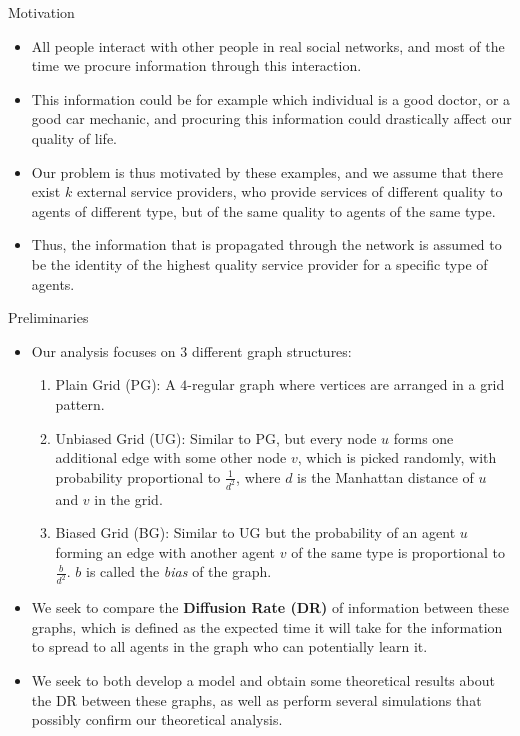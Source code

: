 \documentclass{beamer}
\begin{document}
\begin{frame}{Motivation}

\pause
\begin{itemize}
\item All people interact with other people in real social networks, and most of the time we procure information
through this interaction.
\pause
\item This information could be for example which individual is a good doctor, or a good car mechanic, and
procuring this information could drastically affect our quality of life.
\pause
\item Our problem is thus motivated by these examples, and we assume that there exist $k$ external service providers,
who provide services of different quality to agents of different type, but of the same quality to agents of the same type.
\pause
\item Thus, the information that is propagated through the network is assumed to be the identity of the highest quality
service provider for a specific type of agents.
\end{itemize}

\end{frame}

\begin{frame}{Preliminaries}

\pause
\begin{itemize}
\item Our analysis focuses on $3$ different graph structures:
	\pause
	\begin{enumerate}
	\item Plain Grid (PG): A $4$-regular graph where vertices are arranged in a grid pattern.
	\pause
	\item Unbiased Grid (UG): Similar to PG, but every node $u$ forms one additional edge with some other node
	$v$, which is picked randomly, with probability	proportional to $\frac{1}{d^2}$, where $d$ is
	the Manhattan distance of $u$ and $v$ in the grid.
	\pause
	\item Biased Grid (BG): Similar to UG but the probability of an agent $u$ forming an edge with another agent
	$v$ of the same type is proportional to $\frac{b}{d^2}$. $b$ is called the \textit{bias} of the graph.
	\end{enumerate}
\pause
\item We seek to compare the \textbf{Diffusion Rate (DR)} of information between these graphs, which is defined
as the expected time it will take for the information to spread to all agents in the graph who can potentially
learn it.
\pause
\item We seek to both develop a model and obtain some theoretical results about the DR between these graphs,
as well as perform several simulations that possibly confirm our theoretical analysis.
\end{itemize}

\end{frame}
\end{document}
